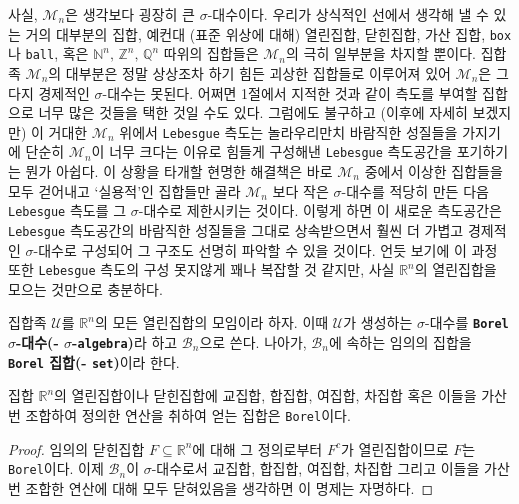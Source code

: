 사실, $\mathcal{M}_n$은 생각보다 굉장히 큰 $\sigma$-대수이다. 우리가 상식적인 선에서 생각해 낼 수 있는 거의 대부분의 집합, 예컨대 (표준 위상에 대해) 열린집합, 닫힌집합, 가산 집합, \texttt{box}나 \texttt{\texttt{ball}}, 혹은 $\mathbb{N}^n,\,\mathbb{Z}^n,\,\mathbb{Q}^n$ 따위의 집합들은 $\mathcal{M}_n$의 극히 일부분을 차지할 뿐이다. 집합족 $\mathcal{M}_n$의 대부분은 정말 상상조차 하기 힘든 괴상한 집합들로 이루어져 있어 $\mathcal{M}_n$은 그다지 경제적인 $\sigma$-대수는 못된다.\footnotemark\label{note:lebesgueCardinal} 어쩌면 1절에서 지적한 것과 같이 측도를 부여할 집합으로 너무 많은 것들을 택한 것일 수도 있다. 그럼에도 불구하고 (이후에 자세히 보겠지만) 이 거대한 $\mathcal{M}_n$ 위에서 \texttt{Lebesgue} 측도는 놀라우리만치 바람직한 성질들을 가지기에 단순히 $\mathcal{M}_n$이 너무 크다는 이유로 힘들게 구성해낸 \texttt{Lebesgue} 측도공간을 포기하기는 뭔가 아쉽다. 이 상황을 타개할 현명한 해결책은 바로 $\mathcal{M}_n$ 중에서 이상한 집합들을 모두 걷어내고 `실용적'인 집합들만 골라 $\mathcal{M}_n$ 보다 작은 $\sigma$-대수를 적당히 만든 다음 \texttt{Lebesgue} 측도를 그 $\sigma$-대수로 제한시키는 것이다. 이렇게 하면 이 새로운 측도공간은 \texttt{Lebesgue} 측도공간의 바람직한 성질들을 그대로 상속받으면서 훨씬 더 가볍고 경제적인 $\sigma$-대수로 구성되어 그 구조도 선명히 파악할 수 있을 것이다. 언듯 보기에 이 과정 또한 \texttt{Lebesgue} 측도의 구성 못지않게 꽤나 복잡할 것 같지만, 사실 $\mathbb{R}^n$의 열린집합을 모으는 것만으로 충분하다.

\begin{definition}
    집합족 $\mathcal{U}$를 $\mathbb{R}^n$의 모든 열린집합의 모임이라 하자. 이때 $\mathcal{U}$가 생성하는 $\sigma$-대수를 \textbf{\texttt{Borel} $\sigma$-대수(- $\sigma$-\texttt{algebra})}라 하고 $\mathcal{B}_n$으로 쓴다. 나아가, $\mathcal{B}_n$에 속하는 임의의 집합을 \textbf{\texttt{Borel} 집합(- \texttt{set})}이라 한다.
\end{definition}

\begin{proposition}
    집합 $\mathbb{R}^n$의 열린집합이나 닫힌집합에 교집합, 합집합, 여집합, 차집합 혹은 이들을 가산번 조합하여 정의한 연산을 취하여 얻는 집합은 \texttt{Borel}이다.
\end{proposition}

\begin{proof}
    임의의 닫힌집합 $F\subseteq\mathbb{R}^n$에 대해 그 정의로부터 $F^c$가 열린집합이므로 $F$는 \texttt{Borel}이다. 이제 $\mathcal{B}_n$이 $\sigma$-대수로서 교집합, 합집합, 여집합, 차집합 그리고 이들을 가산번 조합한 연산에 대해 모두 닫혀있음을 생각하면 이 명제는 자명하다.
\end{proof}

